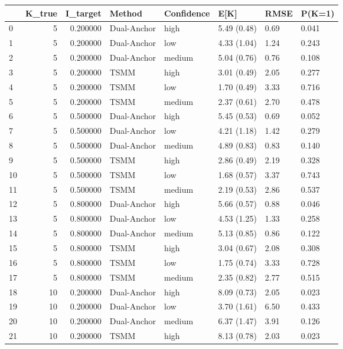 \begin{tabular}{lrrlllll}
\toprule
 & K_true & I_target & Method & Confidence & E[K] & RMSE & P(K=1) \\
\midrule
0 & 5 & 0.200000 & Dual-Anchor & high & 5.49 (0.48) & 0.69 & 0.041 \\
1 & 5 & 0.200000 & Dual-Anchor & low & 4.33 (1.04) & 1.24 & 0.243 \\
2 & 5 & 0.200000 & Dual-Anchor & medium & 5.04 (0.76) & 0.76 & 0.108 \\
3 & 5 & 0.200000 & TSMM & high & 3.01 (0.49) & 2.05 & 0.277 \\
4 & 5 & 0.200000 & TSMM & low & 1.70 (0.49) & 3.33 & 0.716 \\
5 & 5 & 0.200000 & TSMM & medium & 2.37 (0.61) & 2.70 & 0.478 \\
6 & 5 & 0.500000 & Dual-Anchor & high & 5.45 (0.53) & 0.69 & 0.052 \\
7 & 5 & 0.500000 & Dual-Anchor & low & 4.21 (1.18) & 1.42 & 0.279 \\
8 & 5 & 0.500000 & Dual-Anchor & medium & 4.89 (0.83) & 0.83 & 0.140 \\
9 & 5 & 0.500000 & TSMM & high & 2.86 (0.49) & 2.19 & 0.328 \\
10 & 5 & 0.500000 & TSMM & low & 1.68 (0.57) & 3.37 & 0.743 \\
11 & 5 & 0.500000 & TSMM & medium & 2.19 (0.53) & 2.86 & 0.537 \\
12 & 5 & 0.800000 & Dual-Anchor & high & 5.66 (0.57) & 0.88 & 0.046 \\
13 & 5 & 0.800000 & Dual-Anchor & low & 4.53 (1.25) & 1.33 & 0.258 \\
14 & 5 & 0.800000 & Dual-Anchor & medium & 5.13 (0.85) & 0.86 & 0.122 \\
15 & 5 & 0.800000 & TSMM & high & 3.04 (0.67) & 2.08 & 0.308 \\
16 & 5 & 0.800000 & TSMM & low & 1.75 (0.74) & 3.33 & 0.728 \\
17 & 5 & 0.800000 & TSMM & medium & 2.35 (0.82) & 2.77 & 0.515 \\
18 & 10 & 0.200000 & Dual-Anchor & high & 8.09 (0.73) & 2.05 & 0.023 \\
19 & 10 & 0.200000 & Dual-Anchor & low & 3.70 (1.61) & 6.50 & 0.433 \\
20 & 10 & 0.200000 & Dual-Anchor & medium & 6.37 (1.47) & 3.91 & 0.126 \\
21 & 10 & 0.200000 & TSMM & high & 8.13 (0.78) & 2.03 & 0.023 \\

\end{tabular}

